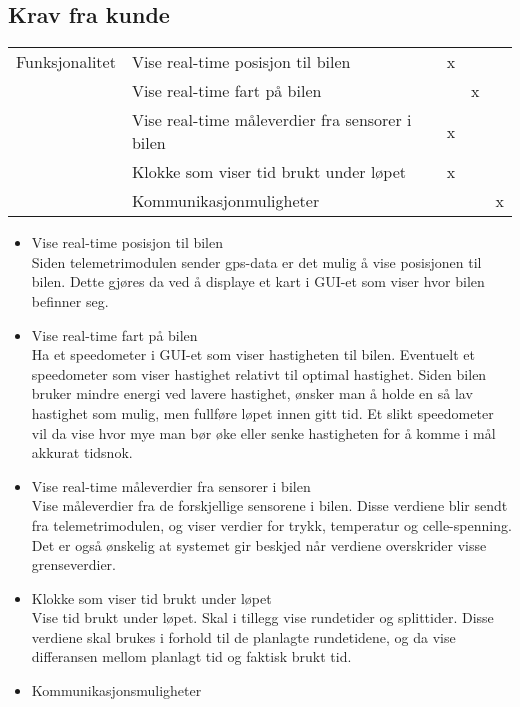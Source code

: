 \subsection{Krav fra kunde}
\begin{tabular}{|r|l|l|l|l|} 
    \hline 
        Funksjonalitet  & Vise real-time posisjon til bilen & x &   & \\ \cline{2-5} 
                & Vise real-time fart på bilen &  & x  & \\ \cline{2-5} 
                & Vise real-time måleverdier fra sensorer i bilen & x &   & \\ \cline{2-5} 
                & Klokke som viser tid brukt under løpet   &  x &  & \\ \cline{2-5} 
                & Kommunikasjonmuligheter &  &   & x \\ \hline 
         \end{tabular}
\begin{itemize}
\item Vise real-time posisjon til bilen \\
Siden telemetrimodulen sender gps-data er det mulig  å vise posisjonen til bilen. Dette gjøres da ved å displaye et kart i GUI-et som viser hvor bilen befinner seg.
\item Vise real-time fart på bilen \\
Ha et speedometer i GUI-et som viser hastigheten til bilen. Eventuelt et speedometer som viser hastighet relativt til optimal hastighet. Siden bilen bruker mindre energi ved lavere hastighet, ønsker man å holde en så lav hastighet som mulig, men fullføre løpet innen gitt tid. Et slikt speedometer vil da vise hvor mye man bør øke eller senke hastigheten for å komme i mål akkurat tidsnok.
\item  Vise real-time måleverdier fra sensorer i bilen \\
Vise måleverdier fra de forskjellige sensorene i bilen. Disse verdiene blir sendt fra telemetrimodulen, og viser verdier for trykk, temperatur og celle-spenning. Det er også ønskelig at systemet gir beskjed når verdiene overskrider visse grenseverdier. 
\item Klokke som viser tid brukt under løpet \\
Vise tid brukt under løpet. Skal i tillegg vise rundetider og splittider. Disse verdiene skal brukes i forhold til de planlagte rundetidene, og da vise differansen mellom planlagt tid og faktisk brukt tid. 
\item Kommunikasjonsmuligheter \\
\end{itemize}
